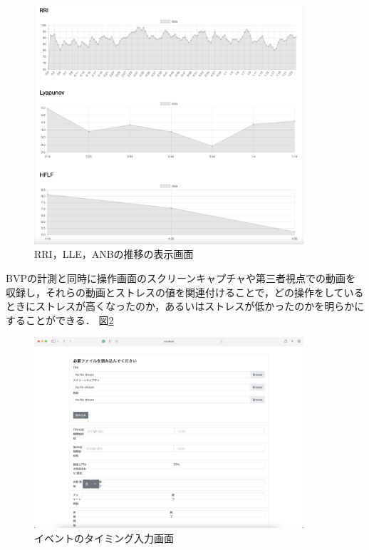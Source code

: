 \begin{figure}[htbp]
  \begin{minipage}{\hsize}
    \begin{center}
       \includegraphics[width=100mm]{img/uxgraph1}
    \end{center}
    \caption{RRI，LLE，ANBの推移の表示画面}
    \label{fig:uxgraph1}
  \end{minipage}
\end{figure}

BVPの計測と同時に操作画面のスクリーンキャプチャや第三者視点での動画を収録し，それらの動画とストレスの値を関連付けることで，どの操作をしているときにストレスが高くなったのか，あるいはストレスが低かったのかを明らかにすることができる．
図\ref{fig:eventmap}

\begin{figure}[htbp]
  \begin{minipage}{\hsize}
    \begin{center}
       \includegraphics[width=100mm]{img/eventmap}
    \end{center}
    \caption{イベントのタイミング入力画面}
    \label{fig:eventmap}
  \end{minipage}
\end{figure}

